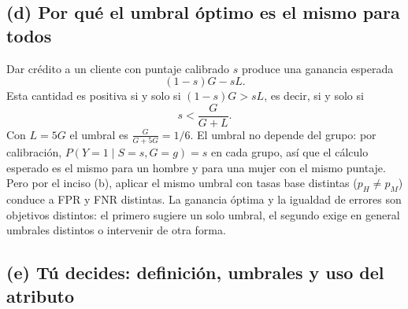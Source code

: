 \subsection*{(d) Por qué el umbral óptimo es el mismo para todos}

Dar crédito a un cliente con puntaje calibrado $s$ produce una ganancia
esperada
\[
(1-s)G-sL.
\]
Esta cantidad es positiva si y solo si $(1-s)G>sL$, es decir, si y solo si
\[
s<\frac{G}{G+L}.
\]
Con $L=5G$ el umbral es $\frac{G}{G+5G}=1/6$. El umbral no depende del grupo:
por calibración, $P(Y=1\mid S=s,G=g)=s$ en cada grupo, así que el cálculo
esperado es el mismo para un hombre y para una mujer con el mismo puntaje.
Pero por el inciso (b), aplicar el mismo umbral con tasas base distintas
($p_H\neq p_M$) conduce a FPR y FNR distintas. La ganancia óptima y la
igualdad de errores son objetivos distintos: el primero sugiere un solo
umbral, el segundo exige en general umbrales distintos o intervenir de otra
forma.

\subsection*{(e) Tú decides: definición, umbrales y uso del atributo}

